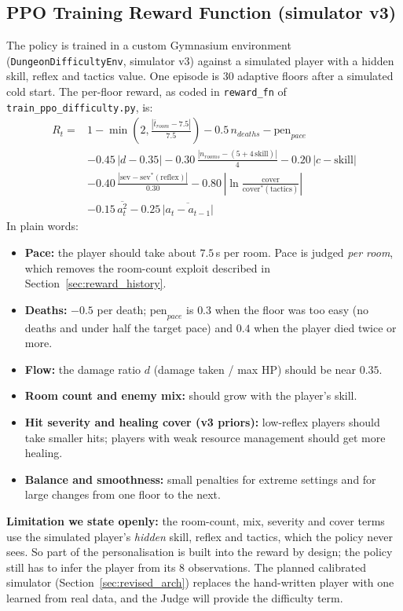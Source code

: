 \subsection{PPO Training Reward Function (simulator v3)}
\label{sec:reward}
The policy is trained in a custom Gymnasium environment (\texttt{DungeonDifficultyEnv}, simulator v3) against a simulated player with a hidden skill, reflex and tactics value. One episode is 30 adaptive floors after a simulated cold start. The per-floor reward, as coded in \texttt{reward\_fn} of \texttt{train\_ppo\_difficulty.py}, is:
\begin{equation}
\begin{aligned}
R_t = {} & 1 - \min\!\left(2, \tfrac{|\bar t_{room} - 7.5|}{7.5}\right) - 0.5\,n_{deaths} - \text{pen}_{pace} \\
& - 0.45\,|d - 0.35| - 0.30\,\tfrac{|n_{rooms} - (5 + 4\,\text{skill})|}{4} - 0.20\,|c - \text{skill}| \\
& - 0.40\,\tfrac{|\text{sev} - \text{sev}^*(\text{reflex})|}{0.30} - 0.80\,\left|\ln \tfrac{\text{cover}}{\text{cover}^*(\text{tactics})}\right| \\
& - 0.15\,\overline{a_t^2} - 0.25\,\overline{|a_t - a_{t-1}|}
\end{aligned}
\label{eq:reward_function}
\end{equation}
In plain words:
\begin{itemize}
    \item \textbf{Pace:} the player should take about $7.5$\,s per room. Pace is judged \emph{per room}, which removes the room-count exploit described in Section~\ref{sec:reward_history}.
    \item \textbf{Deaths:} $-0.5$ per death; $\text{pen}_{pace}$ is $0.3$ when the floor was too easy (no deaths and under half the target pace) and $0.4$ when the player died twice or more.
    \item \textbf{Flow:} the damage ratio $d$ (damage taken / max HP) should be near $0.35$.
    \item \textbf{Room count and enemy mix:} should grow with the player's skill.
    \item \textbf{Hit severity and healing cover (v3 priors):} low-reflex players should take smaller hits; players with weak resource management should get more healing.
    \item \textbf{Balance and smoothness:} small penalties for extreme settings and for large changes from one floor to the next.
\end{itemize}
\textbf{Limitation we state openly:} the room-count, mix, severity and cover terms use the simulated player's \emph{hidden} skill, reflex and tactics, which the policy never sees. So part of the personalisation is built into the reward by design; the policy still has to infer the player from its 8 observations. The planned calibrated simulator (Section~\ref{sec:revised_arch}) replaces the hand-written player with one learned from real data, and the Judge will provide the difficulty term.

